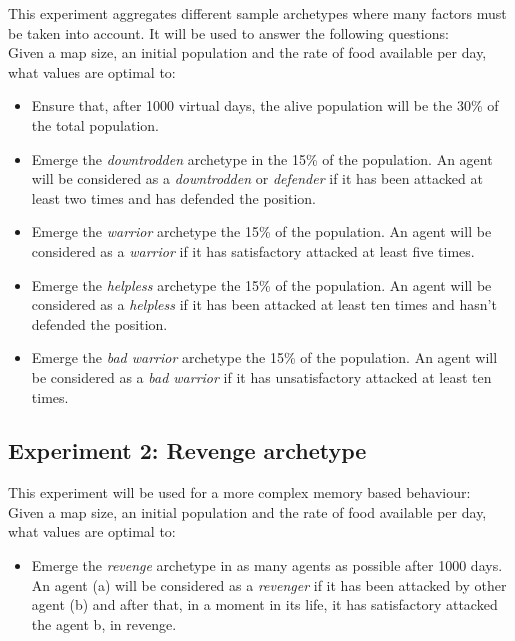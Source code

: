 \documentclass[runningheads]{llncs}
\begin{document}
This experiment aggregates different sample archetypes where many factors must be taken into account. It will be used to answer the following questions:\\

Given a map size, an initial population and the rate of food available per day, what values are optimal to:
\begin{itemize}
\item Ensure that, after 1000 virtual days, the alive population will be the 30\% of the total population.
\item Emerge the \textit{downtrodden} archetype in the 15\% of the
  population. An agent will be considered as a \textit{downtrodden} or
  \textit{defender} if it has been attacked at least two times and has
  defended the position. 
\item Emerge the \textit{warrior} archetype the 15\% of the population. An agent will be considered as a \textit{warrior} if it has satisfactory attacked at least five times. 
\item Emerge the \textit{helpless} archetype the 15\% of the population. An agent will be considered as a \textit{helpless}  if it has been attacked at least ten times and hasn't defended the position.
\item Emerge the \textit{bad warrior} archetype the 15\% of the population. An agent will be considered as a \textit{bad warrior}  if it has unsatisfactory attacked at least ten times.
\end{itemize}


\subsection{Experiment 2: Revenge archetype}
\label{sec:setup_exp2}

This experiment will be used for a more complex memory based behaviour:\\

Given a map size, an initial population and the rate of food available per day, what values are optimal to:
\begin{itemize}
\item Emerge the \textit{revenge} archetype in as many agents as possible after 1000 days.  An agent (a) will be considered as a \textit{revenger} if it has been attacked by other agent (b) and after that, in a moment in its life, it has satisfactory attacked the agent b, in revenge.
\end{itemize}
\end{document}
